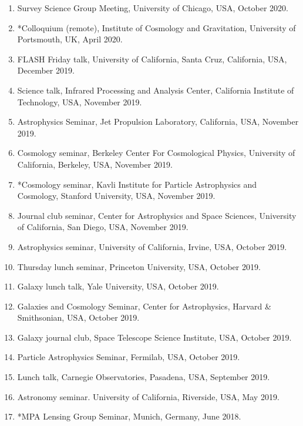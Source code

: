 \documentclass[margin, line]{res}
\begin{document}
\begin{resume}
\begin{enumerate}
	\item Survey Science Group Meeting, University of Chicago, USA, October 2020.
	\item {*}Colloquium (remote), Institute of Cosmology and Gravitation, University of Portsmouth, UK, April 2020.
	\item FLASH Friday talk, University of California, Santa Cruz, California, USA, December 2019.
	\item Science talk, Infrared Processing and Analysis Center, California Institute of Technology, USA, November 2019.
	\item Astrophysics Seminar, Jet Propulsion Laboratory, California, USA, November 2019.
	\item Cosmology seminar, Berkeley Center For Cosmological Physics, University of California, Berkeley, USA, November 2019. 
	\item *Cosmology seminar, Kavli Institute for Particle Astrophysics and Cosmology, Stanford University, USA, November 2019.
	\item Journal club seminar, Center for Astrophysics and Space Sciences, University of California, San Diego, USA, November 2019.
	\item Astrophysics seminar, University of California, Irvine, USA, October 2019.
	\item Thursday lunch seminar, Princeton University, USA, October 2019.
	\item Galaxy lunch talk, Yale University, USA, October 2019.
	\item Galaxies and Cosmology Seminar, Center for Astrophysics, Harvard \& Smithsonian, USA, October 2019.
	\item Galaxy journal club, Space Telescope Science Institute, USA, October 2019.
	\item Particle Astrophysics Seminar, Fermilab, USA, October 2019.
	\item Lunch talk, Carnegie Observatories, Pasadena, USA, September 2019.
	\item Astronomy seminar. University of California, Riverside, USA, May 2019. 
	\item {*}MPA Lensing Group Seminar, Munich, Germany, June 2018.
\end{enumerate}



\end{resume}
\end{document}
